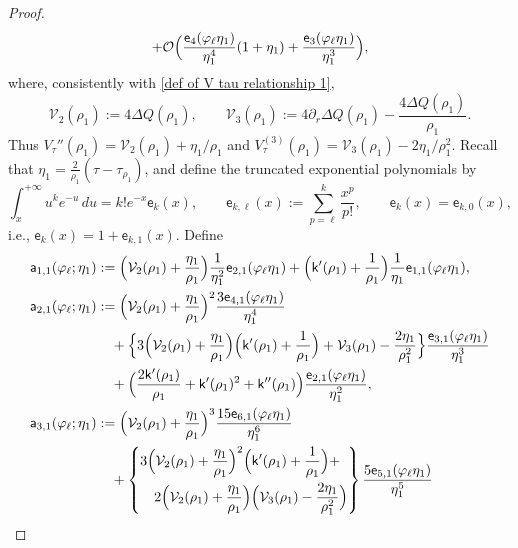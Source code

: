 \documentclass[a4paper]{article}
\numberwithin{equation}{section}
\begin{document}
\begin{proof}
\begin{align*}
+
\mathcal{O}\Bigl( 
\frac{\mathsf{e}_4(\varphi_{\ell}\eta_1)}{\eta_1^4}(1+\eta_1)
+
\frac{\mathsf{e}_3(\varphi_{\ell}\eta_1)}{\eta_1^3}
\Bigr),
\end{align*}
where, consistently with \eqref{def of V tau relationship 1},
\[
\mathcal V_2(\rho_1):=4\Delta Q(\rho_1),
\qquad
\mathcal V_3(\rho_1):=4\partial_r\Delta Q(\rho_1)
-\frac{4\Delta Q(\rho_1)}{\rho_1}.
\]
Thus $V_\tau''(\rho_1)=\mathcal V_2(\rho_1)+\eta_1/\rho_1$ and
$V_\tau^{(3)}(\rho_1)=\mathcal V_3(\rho_1)-2\eta_1/\rho_1^2$.  Recall that
$\eta_1=\frac{2}{\rho_1}(\tau-\tau_{\rho_1})$, and define the truncated
exponential polynomials by
\begin{equation}
    \label{def of mathsf ek}
\int_{x}^{+\infty}u^k e^{-u}\,du=k!e^{-x}\mathsf{e}_k(x),\qquad
    \mathsf{e}_{k,\ell}(x):=\sum_{p=\ell}^k \frac{x^p}{p!}, \qquad
    \mathsf{e}_{k}(x)=\mathsf{e}_{k,0}(x), 
\end{equation}
i.e., $\mathsf{e}_{k}(x)=1+\mathsf{e}_{k,1}(x)$. 
Define 
\begin{align*}
\mathsf{a}_{1,1}(\varphi_{\ell};\eta_1)&:=
\Bigl(\mathcal{V}_2(\rho_1)+\frac{\eta_1}{\rho_1}\Bigr)\frac{1}{\eta_1^2}\mathsf{e}_{2,1}(\varphi_{\ell}\eta_1)+\Bigl(\mathsf{k}'(\rho_1)+\frac{1}{\rho_1}\Bigr)\frac{1}{\eta_1}\mathsf{e}_{1,1}(\varphi_{\ell}\eta_1),
\\
\mathsf{a}_{2,1}(\varphi_{\ell};\eta_1)&:=
\Bigl(\mathcal{V}_2(\rho_1)+\frac{\eta_1}{\rho_1}\Bigr)^2
\frac{3\mathsf{e}_{4,1}(\varphi_{\ell}\eta_1)}{\eta_1^4}
\\
&\quad+
\Bigl\{
3\Bigl(\mathcal{V}_2(\rho_1)+\frac{\eta_1}{\rho_1}\Bigr)
\Bigl(\mathsf{k}'(\rho_1)+\frac{1}{\rho_1}\Bigr)
+\mathcal{V}_3(\rho_1)-\frac{2\eta_1}{\rho_1^2}
\Bigr\}
\frac{\mathsf{e}_{3,1}(\varphi_{\ell}\eta_1)}{\eta_1^3}
\\
&\quad 
+\Bigl(\frac{2\mathsf{k}'(\rho_1)}{\rho_1}+\mathsf{k}'(\rho_1)^2+\mathsf{k}''(\rho_1)\Bigr)
\frac{\mathsf{e}_{2,1}(\varphi_{\ell}\eta_1)}{\eta_1^2}, 
\\
\mathsf{a}_{3,1}(\varphi_{\ell};\eta_1)&:=
\Bigl(\mathcal{V}_2(\rho_1)+\frac{\eta_1}{\rho_1}\Bigr)^3
\frac{15\mathsf{e}_{6,1}(\varphi_{\ell}\eta_1)}{\eta_1^6}
\\
&\quad 
+
\left\{\begin{aligned}&
3\Bigl(\mathcal{V}_2(\rho_1)+\frac{\eta_1}{\rho_1}\Bigr)^2\Bigl(\mathsf{k}'(\rho_1)+\frac{1}{\rho_1}\Bigr)
+
\\
&\quad 2\Bigl(\mathcal{V}_2(\rho_1)+\frac{\eta_1}{\rho_1}\Bigr)\Bigl(\mathcal{V}_3(\rho_1)-\frac{2\eta_1}{\rho_1^2}\Bigr)
\end{aligned}\right\}\frac{5\mathsf{e}_{5,1}(\varphi_{\ell}\eta_1)}{\eta_1^5}

\end{align*}
\end{proof}
\end{document}
